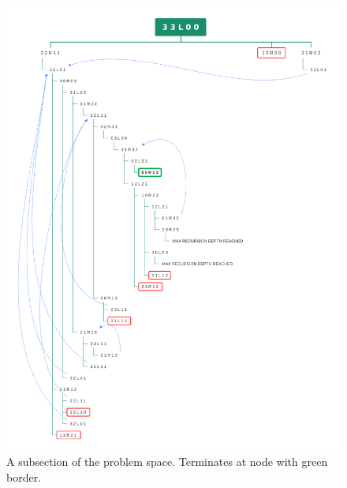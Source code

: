 \documentclass{article}
\begin{document}
\begin{figure}[h!]
  \includegraphics[width=\linewidth]{nuns.png}
  \caption{A subsection of the problem space. Terminates at node with green border.}
  \label{fig:nuns}
\end{figure}


 

\end{document}
